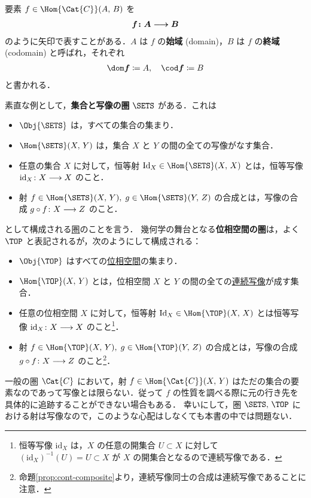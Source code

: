 \documentclass[geometry_main]{subfiles}
\begin{document}
\begin{marker}
	要素 $f \in \Hom{\Cat{C}} (A,\, B)$ を
	\begin{align}
		\bm{f \colon A \longrightarrow B}
	\end{align}
	のように矢印で表すことがある．$A$ は $f$ の\textbf{始域} (domain)，$B$ は $f$ の\textbf{終域} (codomain) と呼ばれ，それぞれ
	\begin{align}
		\bm{\dom f} \coloneqq A,\quad \bm{\cod f} \coloneqq B
	\end{align}
	と書かれる．
\end{marker}


素直な例として，\textbf{集合と写像の圏} $\SETS$ がある．これは
\begin{itemize}
	\item $\Obj{\SETS}$ は，すべての集合の集まり．
	\item $\Hom{\SETS}(X,\, Y)$ は，集合 $X$ と $Y$ の間の全ての写像がなす集合．
	\item 任意の集合 $X$ に対して，恒等射 $\mathrm{Id}_X \in \Hom{\SETS}(X,\, X)$ とは，恒等写像 $\mathrm{id}_X \colon X \longrightarrow X$ のこと．
	\item 射 $f \in \Hom{\SETS}(X,\, Y),\; g \in \Hom{\SETS}(Y,\, Z)$ の合成とは，写像の合成 $g\circ f \colon X \longrightarrow Z$ のこと．
\end{itemize}
として構成される\hyperref[def:category]{圏}のことを言う．
幾何学の舞台となる\textbf{位相空間の圏}は，よく $\TOP$ と表記されるが，次のようにして構成される：
\begin{itemize}
	\item $\Obj{\TOP}$ はすべての\hyperref[ax.topo]{位相空間}の集まり．
	\item $\Hom{\TOP}(X,\, Y)$ とは，位相空間 $X$ と $Y$ の間の全ての\hyperref[def.continuous]{連続写像}が成す集合．
	\item 任意の位相空間 $X$ に対して，恒等射 $\mathrm{Id}_X \in \Hom{\TOP}(X,\, X)$ とは恒等写像 $\mathrm{id}_X \colon X \longrightarrow X$ のこと\footnote{恒等写像 $\mathrm{id}_X$ は，$X$ の任意の開集合 $U \subset X$ に対して $(\mathrm{id}_X)^{-1}(U) = U \subset X$ が $X$ の開集合となるので連続写像である．}．
	\item 射 $f \in \Hom{\TOP}(X,\, Y),\; g \in \Hom{\TOP}(Y,\, Z)$ の合成とは，写像の合成 $g \circ f \colon X \longrightarrow Z$ のこと\footnote{命題\ref{prop:cont-composite}より，連続写像同士の合成は連続写像であることに注意．}．
\end{itemize}
一般の圏 $\Cat{C}$ において，射 $f \in \Hom{\Cat{C}}(X,\, Y)$ はただの集合の要素なのであって写像とは限らない．従って $f$ の性質を調べる際に元の行き先を具体的に追跡することができない場合もある．
幸いにして，圏 $\SETS,\, \TOP$ における射は写像なので，このような心配はしなくても本書の中では問題ない．
\end{document}
